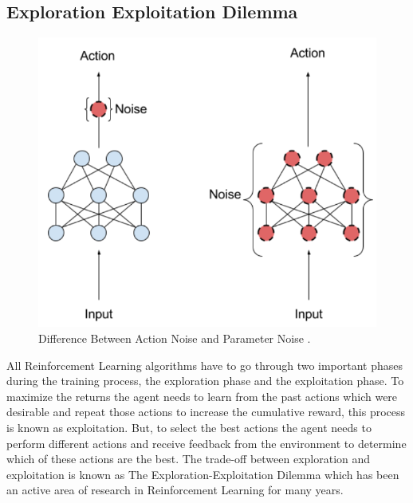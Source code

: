 \subsection{Exploration Exploitation Dilemma}

\begin{figure}[h!]
    \centering
    \includegraphics[width=\textwidth]{images/ANPN.png}
    \caption{Difference Between Action Noise and Parameter Noise \cite{plappert2018parameter}.}
    \label{fig:ANPN}
\end{figure}

All Reinforcement Learning algorithms have to go through two important phases during the training process, the exploration phase and the exploitation phase. To maximize the returns the agent needs to learn from the past actions which were desirable and repeat those actions to increase the cumulative reward, this process is known as exploitation. But, to select the best actions the agent needs to perform different actions and receive feedback from the environment to determine which of these actions are the best. The trade-off between exploration and exploitation is known as The Exploration-Exploitation Dilemma which has been an active area of research in Reinforcement Learning for many years. \\

